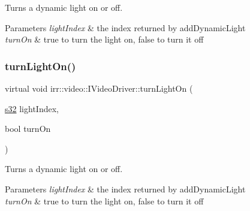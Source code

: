 Turns a dynamic light on or off. 


\begin{DoxyParams}{Parameters}
{\em light\+Index} & the index returned by add\+Dynamic\+Light \\
\hline
{\em turn\+On} & true to turn the light on, false to turn it off \\
\hline
\end{DoxyParams}
\mbox{\label{classirr_1_1video_1_1IVideoDriver_a3c26904f7d1bf0e37d51fe71562346a0}} 
\subsubsection{\texorpdfstring{turn\+Light\+On()}{turnLightOn()}\hspace{0.1cm}{\footnotesize\ttfamily [2/2]}}
{\footnotesize\ttfamily virtual void irr\+::video\+::\+I\+Video\+Driver\+::turn\+Light\+On (\begin{DoxyParamCaption}\item[{\hyperlink{namespaceirr_ac66849b7a6ed16e30ebede579f9b47c6}{s32}}]{light\+Index,  }\item[{bool}]{turn\+On }\end{DoxyParamCaption})\hspace{0.3cm}{\ttfamily [pure virtual]}}



Turns a dynamic light on or off. 


\begin{DoxyParams}{Parameters}
{\em light\+Index} & the index returned by add\+Dynamic\+Light \\
\hline
{\em turn\+On} & true to turn the light on, false to turn it off \\
\hline
\end{DoxyParams}
\mbox{\label{classirr_1_1video_1_1IVideoDriver_ab611513a8cdb3cc62c29b864de0d1de7}} 
